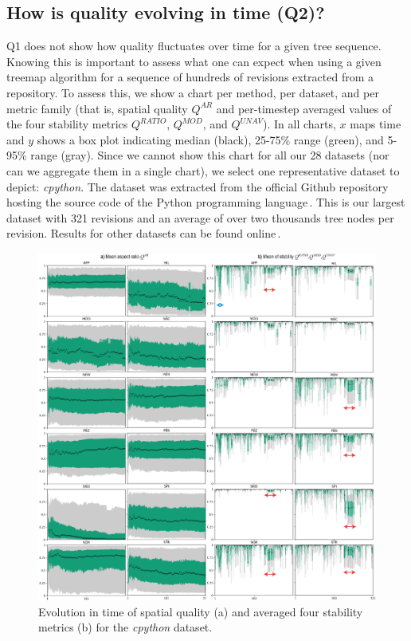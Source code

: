 \subsection{How is quality evolving in time (Q2)?}
\label{sec:q2}
%
%
Q1 does not show how quality fluctuates over time for a given tree sequence. Knowing this is important to assess what one can expect when using a given treemap algorithm for a sequence of hundreds of revisions extracted from a repository. To assess this, we show a chart per method, per dataset, and per metric family (that is, spatial quality $Q^{AR}$ and per-timestep averaged values of the four stability metrics $Q^{RATIO}$, $Q^{MOD}$, and $Q^{UNAV}$). In all charts, $x$ maps time and $y$ shows a box plot indicating median (black), 25-75\% range (green), and 5-95\% range (gray). Since we 
cannot show this chart for all our 28 datasets (nor can we aggregate them in a single chart), we select one representative dataset to depict: \emph{cpython}. The dataset was extracted from the official Github repository hosting the source code of the Python programming language\,\citep{cpython}. This is our largest dataset with 321 revisions and an average of over two thousands tree nodes per revision. Results for other datasets can be found online\,\citep{benchmark}.

\begin{figure}[htbp!]
\centering
\includegraphics[width=1.\textwidth]{figures/initial-treemap-evaluation/boxplots.eps}
\vspace{-0.25cm}
\caption{Evolution in time of spatial quality (a) and averaged four stability metrics (b) for the \emph{cpython} dataset.}
\label{fig:boxplots_1}
\end{figure}

